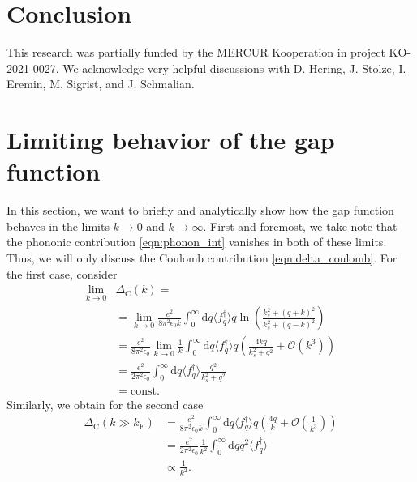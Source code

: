 \documentclass[
    reprint, 
    aps,
    preprintnumbers,
    twocolumn,
    prb,
    superscriptaddress
]{revtex4-2}
\newcommand{\expec}[1]{\langle #1 \rangle}
\newcommand{\kf}{k_{\mathrm{F}}}
\newcommand{\deltaC}{\Delta_\mathrm{C}}
\begin{document}
\section{Conclusion}\label{sec:conclusion}


\begin{acknowledgments} 
	This research was partially funded by the MERCUR Kooperation in project KO-2021-0027. 
  We acknowledge very helpful discussions with D. Hering, J. Stolze, I. Eremin, M. Sigrist, and J. Schmalian.
\end{acknowledgments}


\appendix

\section{Limiting behavior of the gap function}
\label{sec:limiting_gaps}
In this section, we want to briefly and analytically show how the gap function behaves in the limits $k \to 0$ and $k \to \infty$.
First and foremost, we take note that the phononic contribution \eqref{eqn:phonon_int} vanishes in both of these limits.
Thus, we will only discuss the Coulomb contribution \eqref{eqn:delta_coulomb}.
For the first case, consider
\begin{subequations}
\begin{align}
  \lim_{k \to 0}& \deltaC (k) = \\
    &= \lim_{k \to 0} \frac{e^2}{8 \pi^2 \epsilon_0 k} \int_0^\infty \mathrm{d} q \expec{f_{q}^\dagger} q \ln \left( \frac{k_s^2 + (q + k)^2}{k_s^2 + (q - k)^2} \right)\nonumber \\
    &= \frac{e^2}{8 \pi^2 \epsilon_0} \lim_{k \to 0} \frac{1}{k} \int_0^\infty \mathrm{d} q \expec{f_{q}^\dagger} q \left( \frac{4 k q}{k_s^2 + q^2} + \mathcal{O}(k^3) \right) \\
    &= \frac{e^2}{2 \pi^2 \epsilon_0} \int_0^\infty \mathrm{d} q \expec{f_{q}^\dagger} \frac{q^2}{k_s^2 + q^2} \\
    &= \mathrm{const}.
\end{align}
\end{subequations}
Similarly, we obtain for the second case
\begin{subequations}
\begin{align}
  \deltaC (k \gg \kf ) &= \frac{e^2}{8 \pi^2 \epsilon_0 k} \int_0^\infty \mathrm{d} q \expec{f_{q}^\dagger} q \left( \frac{4q}{k} + \mathcal{O}\left( \frac{1}{k^3} \right) \right) \\
  &= \frac{e^2}{2 \pi^2 \epsilon_0 } \frac{1}{k^2} \int_0^\infty \mathrm{d} q q^2 \expec{f_{q}^\dagger} \\
  &\propto \frac{1}{k^2}.
\end{align}
\end{subequations}



\end{document}
